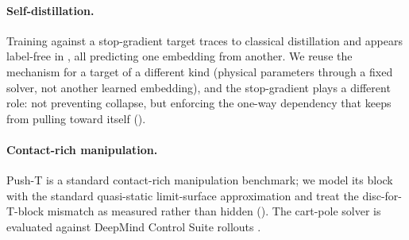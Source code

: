 \paragraph{Self-distillation.}
Training against a stop-gradient target traces to classical
distillation \citep{hinton2015distillation} and appears label-free in
\citep{caron2021dino,grill2020byol,assran2023ijepa}, all predicting one
embedding from another. We reuse the mechanism for a target of a
different kind (physical parameters through a fixed solver, not another
learned embedding), and the stop-gradient plays a different role: not
preventing collapse, but enforcing the one-way dependency that keeps
\pathB from pulling \pathA toward itself ().

\paragraph{Contact-rich manipulation.}
Push-T \citep{chi2023diffusionpolicy} is a standard contact-rich
manipulation benchmark; we model its block with the standard
quasi-static limit-surface approximation and treat the disc-for-T-block
mismatch as measured rather than hidden
(). The cart-pole solver is evaluated
against DeepMind Control Suite rollouts \citep{tassa2018dmcontrol}.
